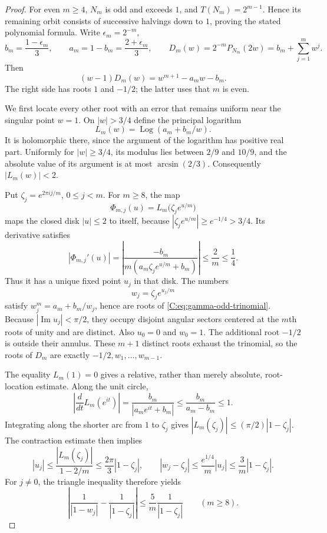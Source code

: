 \documentclass[11pt,a4paper]{article}
\theoremstyle{definition}
\theoremstyle{remark}
\numberwithin{equation}{section}
\begin{document}
\begin{proof}
For even $m\ge4$, $N_m$ is odd and exceeds $1$, and
$T(N_m)=2^{m-1}$. Hence its remaining orbit consists of successive
halvings down to $1$, proving the stated polynomial formula.
Write $\epsilon_m=2^{-m}$,
\[
 b_m=\frac{1-\epsilon_m}{3},\qquad
 a_m=1-b_m=\frac{2+\epsilon_m}{3},\qquad
 D_m(w)=2^{-m}P_{N_m}(2w)=b_m+\sum_{j=1}^{m}w^j.
\]
Then
\begin{equation}\label{C:eq:gamma-odd-trinomial}
 (w-1)D_m(w)=w^{m+1}-a_mw-b_m.
\end{equation}
The right side has roots $1$ and $-1/2$; the latter uses that $m$ is even.

We first locate every other root with an error that remains uniform near
the singular point $w=1$. On $|w|>3/4$ define the principal logarithm
\[
 L_m(w)=\operatorname{Log}(a_m+b_m/w).
\]
It is holomorphic there, since the argument of the logarithm has positive
real part. Uniformly for $|w|\ge3/4$, its modulus lies between $2/9$ and
$10/9$, and the absolute value of its argument is at most
$\arcsin(2/3)$. Consequently $|L_m(w)|<2$.

Put $\zeta_j=e^{2\pi i j/m}$, $0\le j<m$. For $m\ge8$, the map
\[
 \Phi_{m,j}(u)=L_m\bigl(\zeta_j e^{u/m}\bigr)
\]
maps the closed disk $|u|\le2$ to itself, because
$|\zeta_j e^{u/m}|\ge e^{-1/4}>3/4$. Its derivative satisfies
\[
 |\Phi_{m,j}'(u)|
 =\left|\frac{-b_m}{m(a_m\zeta_j e^{u/m}+b_m)}\right|
 \le\frac2m\le\frac14.
\]
Thus it has a unique fixed point $u_j$ in that disk. The numbers
\[
 w_j=\zeta_j e^{u_j/m}
\]
satisfy $w_j^m=a_m+b_m/w_j$, hence are roots of
\eqref{C:eq:gamma-odd-trinomial}. Because $|\operatorname{Im}u_j|<\pi/2$,
they occupy disjoint angular sectors centered at the $m$th roots of unity
and are distinct. Also $u_0=0$ and $w_0=1$. The additional root $-1/2$
is outside their annulus. These $m+1$ distinct roots exhaust the
trinomial, so the roots of $D_m$ are exactly $-1/2,w_1,\ldots,w_{m-1}$.

The equality $L_m(1)=0$ gives a relative, rather than merely absolute,
root-location estimate. Along the unit circle,
\[
 \left|\frac{d}{dt}L_m(e^{it})\right|
 =\frac{b_m}{|a_me^{it}+b_m|}
 \le\frac{b_m}{a_m-b_m}\le1.
\]
Integrating along the shorter arc from $1$ to $\zeta_j$ gives
$|L_m(\zeta_j)|\le(\pi/2)|1-\zeta_j|$. The contraction estimate then
implies
\[
 |u_j|\le\frac{|L_m(\zeta_j)|}{1-2/m}
 \le\frac{2\pi}{3}|1-\zeta_j|,
 \qquad
 |w_j-\zeta_j|
 \le\frac{e^{1/4}}m|u_j|
 \le\frac3m|1-\zeta_j|.
\]
For $j\ne0$, the triangle inequality therefore yields
\begin{equation}\label{C:eq:gamma-odd-weight-error}
 \left|\frac1{|1-w_j|}-\frac1{|1-\zeta_j|}\right|
 \le\frac5m\frac1{|1-\zeta_j|}
 \qquad(m\ge8).
\end{equation}


\end{proof}
\end{document}
